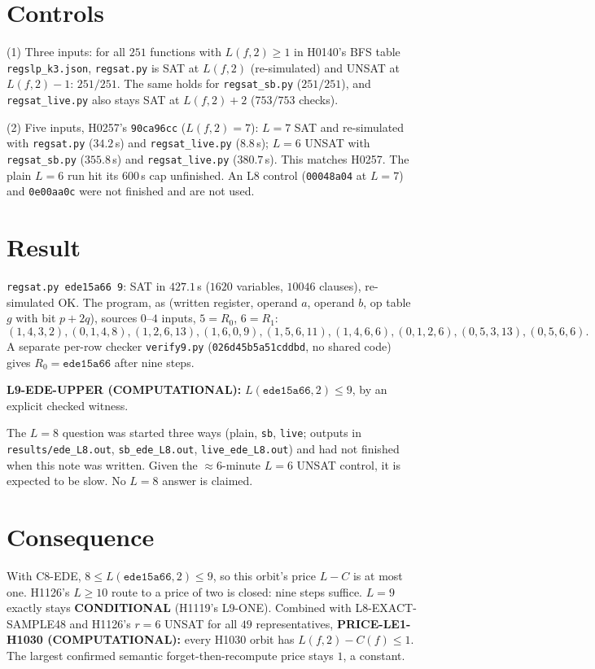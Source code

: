 \documentclass[11pt]{article}
\begin{document}
\section*{Controls}
(1) Three inputs: for all $251$ functions with $L(f,2)\ge1$ in H0140's BFS table \texttt{regslp\_k3.json}, \texttt{regsat.py} is SAT at $L(f,2)$ (re-simulated) and UNSAT at $L(f,2)-1$: $251/251$. The same holds for \texttt{regsat\_sb.py} ($251/251$), and \texttt{regsat\_live.py} also stays SAT at $L(f,2)+2$ ($753/753$ checks).

(2) Five inputs, H0257's \texttt{90ca96cc} ($L(f,2)=7$): $L=7$ SAT and re-simulated with \texttt{regsat.py} ($34.2$\,s) and \texttt{regsat\_live.py} ($8.8$\,s); $L=6$ UNSAT with \texttt{regsat\_sb.py} ($355.8$\,s) and \texttt{regsat\_live.py} ($380.7$\,s). This matches H0257. The plain $L=6$ run hit its $600$\,s cap unfinished. An L8 control (\texttt{00048a04} at $L=7$) and \texttt{0e00aa0c} were not finished and are not used.

\section*{Result}
\texttt{regsat.py ede15a66 9}: SAT in $427.1$\,s ($1620$ variables, $10046$ clauses), re-simulated OK. The program, as (written register, operand $a$, operand $b$, op table $g$ with bit $p+2q$), sources $0$--$4$ inputs, $5=R_0$, $6=R_1$:
\[(1,4,3,2),(0,1,4,8),(1,2,6,13),(1,6,0,9),(1,5,6,11),(1,4,6,6),(0,1,2,6),(0,5,3,13),(0,5,6,6).\]
A separate per-row checker \texttt{verify9.py} (\texttt{026d45b5a51cddbd}, no shared code) gives $R_0=\texttt{ede15a66}$ after nine steps.

\textbf{L9-EDE-UPPER (COMPUTATIONAL):} $L(\texttt{ede15a66},2)\le9$, by an explicit checked witness.

The $L=8$ question was started three ways (plain, \texttt{sb}, \texttt{live}; outputs in \texttt{results/ede\_L8.out}, \texttt{sb\_ede\_L8.out}, \texttt{live\_ede\_L8.out}) and had not finished when this note was written. Given the $\approx 6$-minute $L=6$ UNSAT control, it is expected to be slow. No $L=8$ answer is claimed.

\section*{Consequence}
With C8-EDE, $8\le L(\texttt{ede15a66},2)\le9$, so this orbit's price $L-C$ is at most one. H1126's $L\ge10$ route to a price of two is closed: nine steps suffice. $L=9$ exactly stays \textbf{CONDITIONAL} (H1119's L9-ONE). Combined with L8-EXACT-SAMPLE48 and H1126's $r=6$ UNSAT for all $49$ representatives, \textbf{PRICE-LE1-H1030 (COMPUTATIONAL):} every H1030 orbit has $L(f,2)-C(f)\le1$. The largest confirmed semantic forget-then-recompute price stays $1$, a constant.
\end{document}
